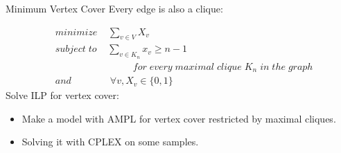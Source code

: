 \documentclass{beamer}
\begin{document}
\begin{frame}{Minimum Vertex Cover}
Every edge is also a clique:

\pause
\begin{align*}
&minimize \; \;\; \; \sum_{v\in V}X_v\\
&subject\; to \;\;\; \; \sum_{v\in K_n}x_v \geq n - 1\\
& \qquad\qquad \qquad\qquad for\; every\; maximal\; clique\; K_n\; in\; the\; graph\\
&and	\qquad\qquad	 \forall v, X_v\in \{0,1\}
\end{align*}
\pause
Solve ILP for vertex cover:
\pause
\begin{itemize}
\item Make a model with AMPL for vertex cover restricted by maximal cliques.
\pause
\item Solving it with CPLEX on some samples.
\end{itemize}

\end{frame}
\begin{comment}

\begin{frame}{Maximal Clique}


\begin{algorithm}[H]
\begin{algorithmic}[1]

\STATE BronKerbosch({$R, P, X$})\\

        \IF{$P$ and $X$ are both empty}{
        
		  	 report $R$ as a maximal clique\\	
		 }\ENDIF
		\FOR{vertex $v$ in $P$}{
		
			   BronKerbosch$(R \cup \{v\}, P \cap N(v), X \cap N(v))$
			   
			    $P := P\setminus \{v\}$
			    
			   	   $X := X\cup \{v\}$\\
		}\ENDFOR

\end{algorithmic}
\caption{Bron-Kerbosch}
\end{algorithm}

\end{frame}
\end{comment}
\end{document}
